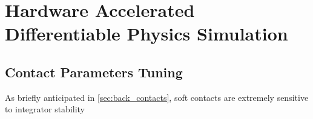 \chapter{Hardware Accelerated Differentiable Physics Simulation}
\label{chp:contrib_JaxSim}

\section{Contact Parameters Tuning}

As briefly anticipated in \cref{sec:back_contacts}, soft contacts are extremely sensitive to integrator stability